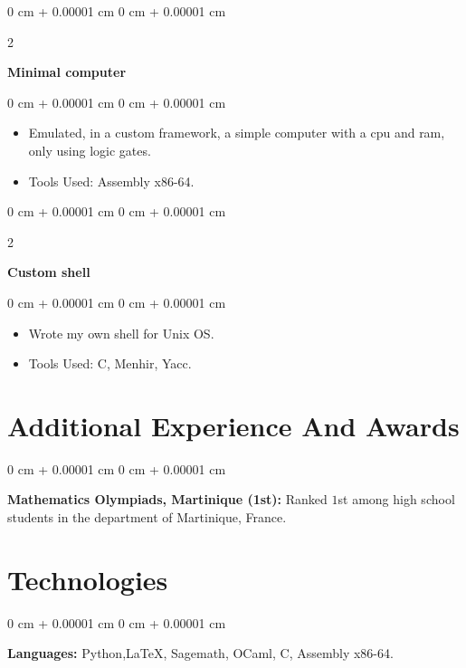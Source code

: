 \documentclass[10pt, letterpaper]{article}
\newenvironment{highlights}{
    \begin{itemize}[
        topsep=0.10 cm,
        parsep=0.10 cm,
        partopsep=0pt,
        itemsep=0pt,
        leftmargin=0 cm + 10pt
    ]
}{
    \end{itemize}
} %
\newenvironment{onecolentry}{
    \begin{adjustwidth}{
        0 cm + 0.00001 cm
    }{
        0 cm + 0.00001 cm
    }
}{
    \end{adjustwidth}
} %
\newenvironment{twocolentry}[2][]{
    \onecolentry
    \def\secondColumn{#2}
    \setcolumnwidth{\fill, 4.5 cm}
    \begin{paracol}{2}
}{
    \switchcolumn \raggedleft \secondColumn
    \end{paracol}
    \endonecolentry
} %
\begin{document}
        \vspace{0.2 cm}
        
        \begin{twocolentry}{
            \href{}{}
        }
            \textbf{Minimal computer}\end{twocolentry}

        \vspace{0.10 cm}
        \begin{onecolentry}
            \begin{highlights}
                \item Emulated, in a custom framework, a simple computer with a cpu and ram, only using logic gates.
                \item Tools Used: Assembly x86-64.
            \end{highlights}
        \end{onecolentry}


        \vspace{0.2 cm}
        
        
        \begin{twocolentry}{
            \href{}{}
        }
            \textbf{Custom shell}\end{twocolentry}

        \vspace{0.10 cm}
        \begin{onecolentry}
            \begin{highlights}
                \item Wrote my own shell for Unix OS.
                \item Tools Used: C, Menhir, Yacc.
            \end{highlights}
        \end{onecolentry}


        \vspace{0.2 cm}



    
    \section{Additional Experience And Awards}



        
        \begin{onecolentry}
            \textbf{Mathematics Olympiads, Martinique (1st):} Ranked $1$st among high school students in the department of Martinique, France.
        \end{onecolentry}


    
    \section{Technologies}



        
        \begin{onecolentry}
            \textbf{Languages:} Python,\LaTeX, Sagemath, OCaml, C, Assembly x86-64.
        \end{onecolentry}
    
\end{document}
